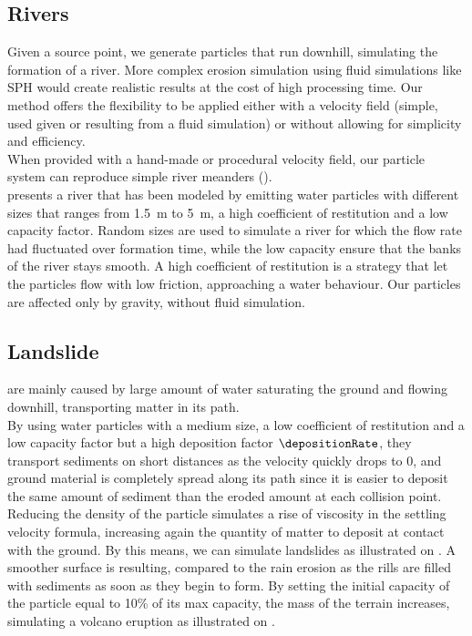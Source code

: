 \subsection{Rivers}
Given a source point, we generate particles that run downhill, simulating the formation of a river. More complex erosion simulation using fluid simulations like SPH \cite{Kristof2009} would create realistic results at the cost of high processing time. Our method offers the flexibility to be applied either with a velocity field (simple, used given or resulting from a fluid simulation) or without allowing for simplicity and efficiency.\\
When provided with a hand-made or procedural velocity field, our particle system can reproduce simple river meanders (). \\ 
 presents a river that has been modeled by emitting water particles with different sizes that ranges from \SI{1.5}{\meter} to \SI{5}{\meter}, a high coefficient of restitution and a low capacity factor. Random sizes are used to simulate a river for which the flow rate had fluctuated over formation time, while the low capacity ensure that the banks of the river stays smooth. A high coefficient of restitution is a strategy that let the particles flow with low friction, approaching a water behaviour. Our particles are affected only by gravity, without fluid simulation.

\subsection{Landslide}
are mainly caused by large amount of water saturating the ground and flowing downhill, transporting matter in its path. \\
By using water particles with a medium size, a low coefficient of restitution and a low capacity factor but a high deposition factor $\depositionRate$, they transport sediments on short distances as the velocity quickly drops to 0, and ground material is completely spread along its path since it is easier to deposit the same amount of sediment than the eroded amount at each collision point. Reducing the density of the particle simulates a rise of viscosity in the settling velocity formula, increasing again the quantity of matter to deposit at contact with the ground. By this means, we can simulate landslides as illustrated on . A smoother surface is resulting, compared to the rain erosion as the rills are filled with sediments as soon as they begin to form.
%
By setting the initial capacity of the particle equal to 10\% of its max capacity, the mass of the terrain increases, simulating a volcano eruption as illustrated on .

